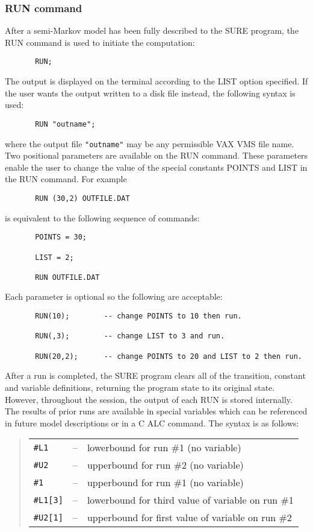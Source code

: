 \subsubsection{RUN command} After a semi-Markov model has been fully described to the SURE program, the {\isf RUN} command is used to initiate the computation:
\begin{verbatim}
       RUN;
\end{verbatim}
The output is displayed on the terminal according to the {\isf LIST} option
specified.  If the user wants the output written to a disk file instead, the
following syntax is used:
\begin{verbatim}
       RUN "outname";
\end{verbatim}
where the output file \verb|"outname"| may be any permissible VAX VMS file
name.  Two positional parameters are available on the {\isf RUN} command.
These parameters enable the user to change the value of the special constants
{\isf POINTS and} {\isf LIST} in the {\isf RUN} command.  For example
\begin{verbatim}
       RUN (30,2) OUTFILE.DAT
\end{verbatim}
is equivalent to the following sequence of commands:
\begin{verbatim}
       POINTS = 30;

       LIST = 2;

       RUN OUTFILE.DAT
\end{verbatim}
Each parameter is optional so the following are acceptable:
\begin{verbatim}
       RUN(10);        -- change POINTS to 10 then run.

       RUN(,3);        -- change LIST to 3 and run.

       RUN(20,2);      -- change POINTS to 20 and LIST to 2 then run.
\end{verbatim}
After a run is completed, the SURE program clears all of the transition,
constant and variable definitions, returning the program state to its original
state.  However, throughout the session, the output of each {\isf RUN} is
stored internally.  The results of prior runs are available in special
variables which can be referenced in future model descriptions or in a C{\isf
ALC} command.  The syntax is as follows:
\begin{quote}
\begin{tabular}{lcl}
    \verb|#L1|   & -- &   lowerbound for run \#1   (no variable) \\

    \verb|#U2|   & -- &   upperbound for run \#2   (no variable) \\

    \verb|#1|    & -- &   upperbound for run \#1   (no variable) \\

    \verb|#L1[3]|& -- &   lowerbound for third value of variable on run \#1 \\

    \verb|#U2[1]|& -- &   upperbound for first value of variable on run \#2 \\
\end{tabular}
\end{quote}


